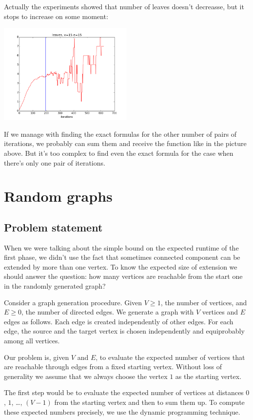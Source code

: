 \documentclass{llncs}
\begin{document}
  Actually the experiments showed that number of leaves doesn't decreasse, but it stops to increase on some moment:
  
  \includegraphics[height=5cm]{pic/leaves_v15e15.png}
  
  If we manage with finding the exact formulas for the other number of pairs of iterations, we probably can sum them and receive the function like in the picture above. 
  But it's too complex to find even the exact formula for the case when there's only one pair of iterations.
  
 \section{Random graphs}
 \subsection{Problem statement}
  When we were talking about the simple bound on the expected runtime of the first phase, we didn't use the fact that sometimes connected component can be extended by more than one vertex. To know the expected size of extension we should answer the question: how many vertices are reachable from the start one in the randomly generated graph?
  
  Consider a graph generation procedure.
  Given $V \ge 1$, the number of vertices, and $E \ge 0$, the number of directed edges.
  We generate a graph with $V$ vertices and $E$ edges as follows. Each edge is created independently 
  of other edges. For each edge, the source and the target vertex is chosen 
  independently and equiprobably among all vertices.
  
  Our problem is, given $V$ and $E$, to evaluate the expected number of vertices that are reachable 
  through edges from a fixed starting vertex. 
  Without loss of generality we assume that we always choose the vertex $1$ as the starting vertex.
  
  The first step would be to evaluate the expected number of vertices 
  at distances $0$, $1$, \ldots, $(V - 1)$ 
  from the starting vertex and then to sum them up. To compute these expected numbers precisely,
  we use the dynamic programming technique.
  
\end{document}
